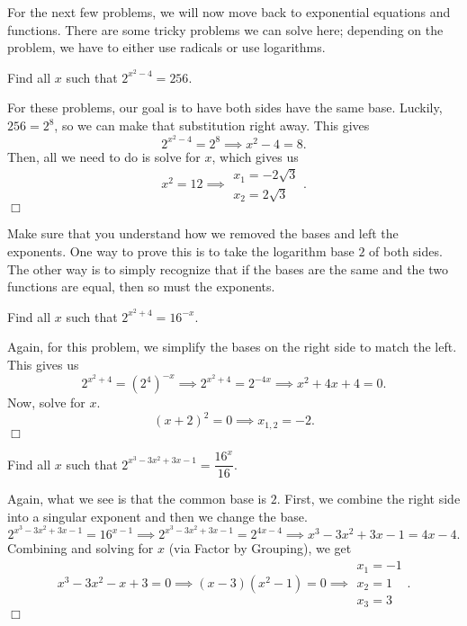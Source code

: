 \documentclass[lang=en,11pt]{elegantbook}
\begin{document}
For the next few problems, we will now move back to exponential equations and functions.  There are some tricky problems we can solve here; depending on the problem, we have to either use radicals or use logarithms.
\begin{example}
Find all $x$ such that $2^{x^2-4}=256$.
\end{example}
\begin{solution}
For these problems, our goal is to have both sides have the same base.  Luckily, $256=2^8$, so we can make that substitution right away.  This gives $$2^{x^2-4}=2^8 \implies x^2-4=8.$$  Then, all we need to do is solve for $x$, which gives us $$x^2=12 \implies \begin{matrix} x_1=-2\sqrt{3} \\ x_2=2\sqrt{3} \end{matrix}.$$ $\Box$
\end{solution}
\begin{remark}
Make sure that you understand how we removed the bases and left the exponents.  One way to prove this is to take the logarithm base $2$ of both sides.  The other way is to simply recognize that if the bases are the same and the two functions are equal, then so must the exponents.
\end{remark}
\begin{example}
Find all $x$ such that $2^{x^2+4}=16^{-x}$.
\end{example}
\begin{solution}
Again, for this problem, we simplify the bases on the right side to match the left.  This gives us $$2^{x^2+4}=\left(2^4\right)^{-x} \implies 2^{x^2+4}=2^{-4x} \implies x^2+4x+4=0.$$  Now, solve for $x$.  $$(x+2)^2=0 \implies x_{1,2}=-2.$$ $\Box$
\end{solution}
\begin{example}
Find all $x$ such that $2^{x^3-3x^2+3x-1}=\dfrac{16^x}{16}$.
\end{example}
\begin{solution}
Again, what we see is that the common base is $2$.  First, we combine the right side into a singular exponent and then we change the base.  $$2^{x^3-3x^2+3x-1}=16^{x-1} \implies 2^{x^3-3x^2+3x-1}=2^{4x-4} \implies x^3-3x^2+3x-1=4x-4.$$ Combining and solving for $x$ (via Factor by Grouping), we get $$x^3-3x^2-x+3=0 \implies (x-3)(x^2-1)=0 \implies \begin{matrix} x_1=-1 \\ x_2=1 \\ x_3=3 \end{matrix}.$$ $\Box$
\end{solution}
\end{document}
